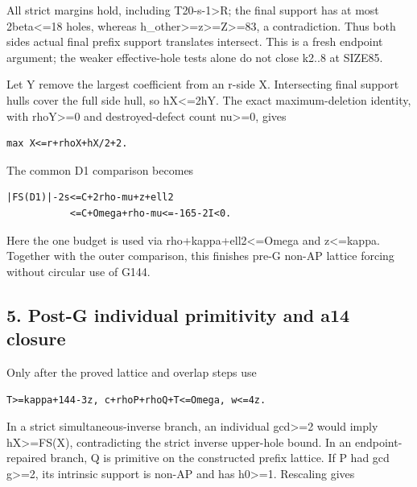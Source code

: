 \documentclass[10pt,a4paper]{article}
\theoremstyle{definition}
\begin{document}
All strict margins hold,\allowbreak{} including T20-s-1\textgreater R; the final
support has at most 2beta\textless=\allowbreak{}18 holes,\allowbreak{} whereas
h\_\allowbreak{}other\textgreater=\allowbreak{}z\textgreater=\allowbreak{}Z\textgreater=\allowbreak{}83,\allowbreak{} a contradiction.
Thus both sides\textquotesingle{} actual final prefix support translates
intersect. This is a fresh endpoint argument; the weaker effective-hole
tests alone do not close k2..8 at SIZE85.

Let Y remove the largest coefficient from an r-side X. Intersecting
final support hulls cover the full side hull,\allowbreak{} so hX\textless=\allowbreak{}2hY. The
exact maximum-deletion identity,\allowbreak{} with rhoY\textgreater=\allowbreak{}0 and
destroyed-defect count nu\textgreater=\allowbreak{}0,\allowbreak{} gives

\begin{lstlisting}
max X<=r+rhoX+hX/2+2.
\end{lstlisting}

The common D1 comparison becomes

\begin{lstlisting}
|FS(D1)|-2s<=C+2rho-mu+z+ell2
           <=C+Omega+rho-mu<=-165-2I<0.
\end{lstlisting}

Here the one budget is used via rho+\allowbreak{}kappa+\allowbreak{}ell2\textless=\allowbreak{}Omega and
z\textless=\allowbreak{}kappa. Together with the outer comparison,\allowbreak{} this finishes
pre-G non-AP lattice forcing without circular use of G144.

\hypertarget{post-g-individual-primitivity-and-a14-closure}{%
\subsection{5. Post-G individual primitivity and a14
closure}\label{post-g-individual-primitivity-and-a14-closure}}

Only after the proved lattice and overlap steps use

\begin{lstlisting}
T>=kappa+144-3z, c+rhoP+rhoQ+T<=Omega, w<=4z.
\end{lstlisting}

In a strict simultaneous-inverse branch,\allowbreak{} an individual gcd\textgreater=\allowbreak{}2
would imply hX\textgreater=\allowbreak{}\textbar FS(X),\allowbreak{} contradicting the
strict inverse upper-hole bound. In an endpoint-repaired branch,\allowbreak{} Q is
primitive on the constructed prefix lattice. If P had gcd
g\textgreater=\allowbreak{}2,\allowbreak{} its intrinsic support is non-AP and has
h0\textgreater=\allowbreak{}1. Rescaling gives
\end{document}
